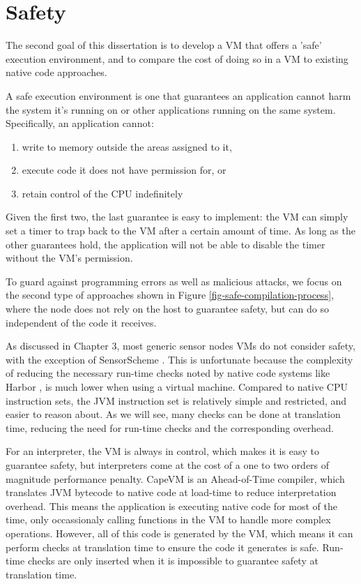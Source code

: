 \chapter{Safety}
\label{sec-safety}


The second goal of this dissertation is to develop a VM that offers a 'safe' execution environment, and to compare the cost of doing so in a VM to existing native code approaches.

A safe execution environment is one that guarantees an application cannot harm the system it's running on or other applications running on the same system. Specifically, an application cannot:
\begin{enumerate}
	\item write to memory outside the areas assigned to it,
	\item execute code it does not have permission for, or
	\item retain control of the CPU indefinitely
\end{enumerate}

Given the first two, the last guarantee is easy to implement: the VM can simply set a timer to trap back to the VM after a certain amount of time. As long as the other guarantees hold, the application will not be able to disable the timer without the VM's permission.

To guard against programming errors as well as malicious attacks, we focus on the second type of approaches shown in Figure \ref{fig-safe-compilation-process}, where the node does not rely on the host to guarantee safety, but can do so independent of the code it receives.

As discussed in Chapter 3, most generic sensor nodes VMs do not consider safety, with the exception of SensorScheme \cite{Evers:2010ur}. This is unfortunate because the complexity of reducing the necessary run-time checks noted by native code systems like Harbor \cite{Kumar:2007ge}, is much lower when using a virtual machine. Compared to native CPU instruction sets, the JVM instruction set is relatively simple and restricted, and easier to reason about. As we will see, many checks can be done at translation time, reducing the need for run-time checks and the corresponding overhead.

For an interpreter, the VM is always in control, which makes it is easy to guarantee safety, but interpreters come at the cost of a one to two orders of magnitude performance penalty. CapeVM is an Ahead-of-Time compiler, which translates JVM bytecode to native code at load-time to reduce interpretation overhead. This means the application is executing native code for most of the time, only occassionaly calling functions in the VM to handle more complex operations. However, all of this code is generated by the VM, which means it can perform checks at translation time to ensure the code it generates is safe. Run-time checks are only inserted when it is impossible to guarantee safety at translation time.

